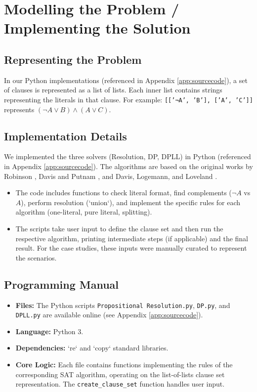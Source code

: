 \documentclass[11pt, a4paper]{article}
\begin{document}
\section{Modelling the Problem / Implementing the Solution} \label{sec:implementation}

\subsection*{Representing the Problem}
In our Python implementations (referenced in Appendix \ref{app:sourcecode}), a set of clauses is represented as a list of lists. Each inner list contains strings representing the literals in that clause. For example: \texttt{[['¬A', 'B'], ['A', 'C']]} represents $(\neg A \vee B) \wedge (A \vee C)$.

\subsection*{Implementation Details}
We implemented the three solvers (Resolution, DP, DPLL) in Python (referenced in Appendix \ref{app:sourcecode}). The algorithms are based on the original works by Robinson \cite{Robinson1965}, Davis and Putnam \cite{DavisPutnam1960}, and Davis, Logemann, and Loveland \cite{DPLL1962}.
\begin{itemize}
    \item The code includes functions to check literal format, find complements ($\neg A$ vs $A$), perform resolution (`union`), and implement the specific rules for each algorithm (one-literal, pure literal, splitting).
    \item The scripts take user input to define the clause set and then run the respective algorithm, printing intermediate steps (if applicable) and the final result. For the case studies, these inputs were manually curated to represent the scenarios.
\end{itemize}

\subsection*{Programming Manual}
\begin{itemize}
    \item \textbf{Files:} The Python scripts \texttt{Propositional Resolution.py}, \texttt{DP.py}, and \texttt{DPLL.py} are available online (see Appendix \ref{app:sourcecode}).
    \item \textbf{Language:} Python 3.
    \item \textbf{Dependencies:} `re` and `copy` standard libraries.
    \item \textbf{Core Logic:} Each file contains functions implementing the rules of the corresponding SAT algorithm, operating on the list-of-lists clause set representation. The \texttt{create\_clause\_set} function handles user input.
\end{itemize}
\end{document}
